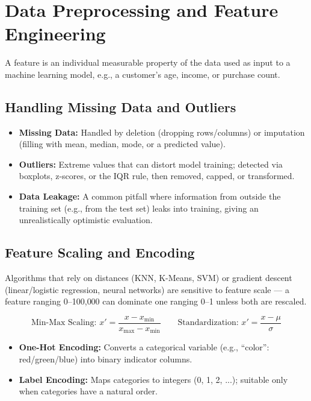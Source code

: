 \documentclass[11pt,a4paper]{article}
\begin{document}
\section{Data Preprocessing and Feature Engineering}

\begin{definitionbox}[Feature]
A feature is an individual measurable property of the data used as input to a machine learning model, e.g., a customer's age, income, or purchase count.
\end{definitionbox}

\subsection{Handling Missing Data and Outliers}
\begin{itemize}[leftmargin=*]
  \item \textbf{Missing Data:} Handled by deletion (dropping rows/columns) or imputation (filling with mean, median, mode, or a predicted value).
  \item \textbf{Outliers:} Extreme values that can distort model training; detected via boxplots, z-scores, or the IQR rule, then removed, capped, or transformed.
  \item \textbf{Data Leakage:} A common pitfall where information from outside the training set (e.g., from the test set) leaks into training, giving an unrealistically optimistic evaluation.
\end{itemize}

\subsection{Feature Scaling and Encoding}
\begin{conceptbox}
Algorithms that rely on distances (KNN, K-Means, SVM) or gradient descent (linear/logistic regression, neural networks) are sensitive to feature scale --- a feature ranging 0--100{,}000 can dominate one ranging 0--1 unless both are rescaled.
\end{conceptbox}
$$
\text{Min-Max Scaling: } x' = \frac{x - x_{\min}}{x_{\max} - x_{\min}}
\qquad
\text{Standardization: } x' = \frac{x - \mu}{\sigma}
$$
\begin{itemize}[leftmargin=*]
  \item \textbf{One-Hot Encoding:} Converts a categorical variable (e.g., ``color'': red/green/blue) into binary indicator columns.
  \item \textbf{Label Encoding:} Maps categories to integers (0, 1, 2, ...); suitable only when categories have a natural order.
\end{itemize}
\end{document}
